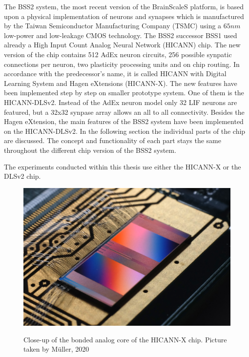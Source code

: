 The BSS2 system, the most recent version of the BrainScaleS platform, is based upon a physical implementation of neurons and synapses which is manufactured by the Taiwan Semiconductor Manufacturing Company (TSMC) using a $65 \si{nm}$ low-power and low-leakage CMOS technology. The BSS2 successor BSS1 used already a High Input Count Analog Neural Network (HICANN) chip. The new version of the chip contains 512 AdEx neuron circuits, 256 possible synpatic connections per neuron, two plasticity processing units and on chip routing. In accordance with the predecessor's name, it is called HICANN with Digital Learning System and Hagen eXtensions (HICANN-X). The new features have been implemented step by step on smaller prototype system. One of them is the HICANN-DLSv2. Instead of the AdEx neuron model only 32 LIF neurons are featured, but a 32x32 synpase array allows an all to all connectivity. Besides the Hagen eXtension, the main features of the BSS2 system have been implemented on the HICANN-DLSv2. In the following section the individual parts of the chip are discussed. The concept and functionality of each part stays the same throughout the different chip version of the BSS2 system.

The experiments conducted within this thesis use either the HICANN-X or the DLSv2 chip.

\begin{figure}
	\includegraphics[width=\linewidth]{figures/HXcloseup.JPG}
	\label{hxcloseup}
	\caption{Close-up of the bonded analog core of the HICANN-X chip. Picture taken by Müller, 2020}
\end{figure}

